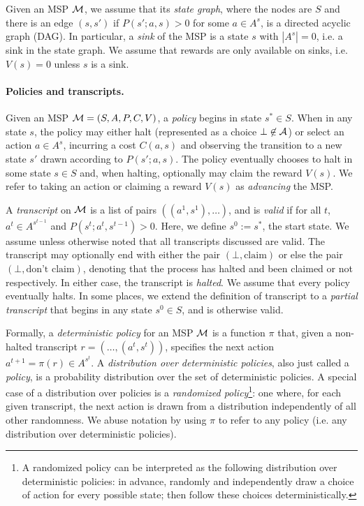 Given an MSP $\mathcal{M}$, we assume that its \emph{state graph}, where the nodes are $S$ and there is an edge $(s,s')$ if $P(s';a,s) > 0$ for some $a \in A^s$, is a directed acyclic graph (DAG).
In particular, a \emph{sink} of the MSP is a state $s$ with $|A^s|=0$, i.e. a sink in the state graph.
We assume that rewards are only available on sinks, i.e. $V(s) = 0$ unless $s$ is a sink.


\paragraph{Policies and transcripts.}
Given an MSP $\mathcal{M} = (S,A,P,C,V)$, a \emph{policy} begins in state $s^* \in S$.
When in any state $s$, the policy may either halt (represented as a choice $\bot \not\in \mathcal{A}$) or select an action $a \in A^s$, incurring a cost $C(a,s)$ and observing the transition to a new state $s'$ drawn according to $P(s';a,s)$.
The policy eventually chooses to halt in some state $s \in S$ and, when halting, optionally may claim the reward $V(s)$.
We refer to taking an action or claiming a reward $V(s)$ as \emph{advancing} the MSP.

A \emph{transcript} on $\mathcal{M}$ is a list of pairs $((a^1,s^1),\dots)$, and is \emph{valid} if for all $t$, $a^t \in A^{s^{t-1}}$ and $P(s^t;a^t,s^{t-1}) > 0$.
Here, we define $s^0 := s^*$, the start state.
We assume unless otherwise noted that all transcripts discussed are valid.
The transcript may optionally end with either the pair $(\bot, \text{claim})$ or else the pair $(\bot, \text{don't claim})$, denoting that the process has halted and been claimed or not respectively.
In either case, the transcript is \emph{halted}.
We assume that every policy eventually halts.
In some places, we extend the definition of transcript to a \emph{partial transcript} that begins in any state $s^0 \in S$, and is otherwise valid.

Formally, a \emph{deterministic policy} for an MSP $\mathcal{M}$ is a function $\pi$ that, given a non-halted transcript $r = (\dots,(a^t,s^t))$, specifies the next action $a^{t+1} = \pi(r) \in A^{s^t}$.
A \emph{distribution over deterministic policies}, also just called a \emph{policy}, is a probability distribution over the set of deterministic policies.
A special case of a distribution over policies is a \emph{randomized policy}\footnote{A randomized policy can be interpreted as the following distribution over deterministic policies: in advance, randomly and independently draw a choice of action for every possible state; then follow these choices deterministically.}: one where, for each given transcript, the next action is drawn from a distribution independently of all other randomness.
We abuse notation by using $\pi$ to refer to any policy (i.e. any distribution over deterministic policies).

